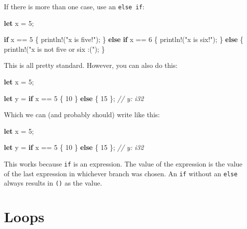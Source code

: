 \documentclass[a4paper,]{book}
\newenvironment{Shaded}{\begin{snugshade}}{\end{snugshade}}
\newcommand{\KeywordTok}[1]{\textcolor[rgb]{0.13,0.29,0.53}{\textbf{{#1}}}}
\newcommand{\DecValTok}[1]{\textcolor[rgb]{0.00,0.00,0.81}{{#1}}}
\newcommand{\StringTok}[1]{\textcolor[rgb]{0.31,0.60,0.02}{{#1}}}
\newcommand{\CommentTok}[1]{\textcolor[rgb]{0.56,0.35,0.01}{\textit{{#1}}}}
\newcommand{\OtherTok}[1]{\textcolor[rgb]{0.56,0.35,0.01}{{#1}}}
\newcommand{\NormalTok}[1]{{#1}}
\begin{document}
If there is more than one case, use an \texttt{else\ if}:

\begin{Shaded}
\begin{Highlighting}[]
\KeywordTok{let} \NormalTok{x = }\DecValTok{5}\NormalTok{;}

\KeywordTok{if} \NormalTok{x == }\DecValTok{5} \NormalTok{\{}
    \OtherTok{println!}\NormalTok{(}\StringTok{"x is five!"}\NormalTok{);}
\NormalTok{\} }\KeywordTok{else} \KeywordTok{if} \NormalTok{x == }\DecValTok{6} \NormalTok{\{}
    \OtherTok{println!}\NormalTok{(}\StringTok{"x is six!"}\NormalTok{);}
\NormalTok{\} }\KeywordTok{else} \NormalTok{\{}
    \OtherTok{println!}\NormalTok{(}\StringTok{"x is not five or six :("}\NormalTok{);}
\NormalTok{\}}
\end{Highlighting}
\end{Shaded}

This is all pretty standard. However, you can also do this:

\begin{Shaded}
\begin{Highlighting}[]
\KeywordTok{let} \NormalTok{x = }\DecValTok{5}\NormalTok{;}

\KeywordTok{let} \NormalTok{y = }\KeywordTok{if} \NormalTok{x == }\DecValTok{5} \NormalTok{\{}
    \DecValTok{10}
\NormalTok{\} }\KeywordTok{else} \NormalTok{\{}
    \DecValTok{15}
\NormalTok{\}; }\CommentTok{// y: i32}
\end{Highlighting}
\end{Shaded}

Which we can (and probably should) write like this:

\begin{Shaded}
\begin{Highlighting}[]
\KeywordTok{let} \NormalTok{x = }\DecValTok{5}\NormalTok{;}

\KeywordTok{let} \NormalTok{y = }\KeywordTok{if} \NormalTok{x == }\DecValTok{5} \NormalTok{\{ }\DecValTok{10} \NormalTok{\} }\KeywordTok{else} \NormalTok{\{ }\DecValTok{15} \NormalTok{\}; }\CommentTok{// y: i32}
\end{Highlighting}
\end{Shaded}

This works because \texttt{if} is an expression. The value of the
expression is the value of the last expression in whichever branch was
chosen. An \texttt{if} without an \texttt{else} always results in
\texttt{()} as the value.

\section{Loops}\label{sec--loops}
\end{document}
